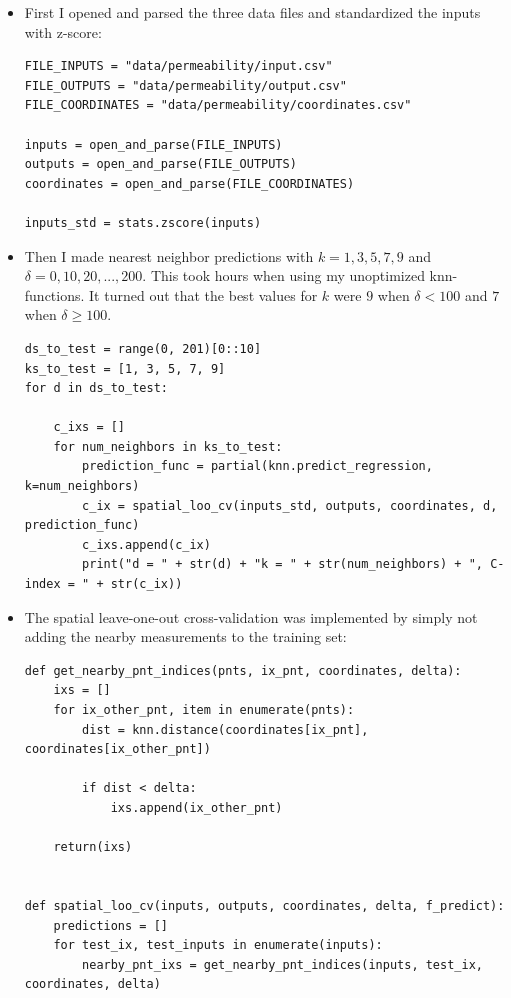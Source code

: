 \documentclass[a4paper]{article}
\begin{document}
\begin{itemize}
\item First I opened and parsed the three data files and standardized the inputs with z-score:


\selectfont
\footnotesize
\begin{lstlisting}
FILE_INPUTS = "data/permeability/input.csv"
FILE_OUTPUTS = "data/permeability/output.csv"
FILE_COORDINATES = "data/permeability/coordinates.csv"

inputs = open_and_parse(FILE_INPUTS)
outputs = open_and_parse(FILE_OUTPUTS)
coordinates = open_and_parse(FILE_COORDINATES)

inputs_std = stats.zscore(inputs)
\end{lstlisting}
\normalsize
\fontfamily{\sfdefault}\selectfont

\item Then I made nearest neighbor predictions with $k = 1,3,5,7,9$ and $\delta = 0, 10, 20, ...,200$. This took hours when using my unoptimized knn-functions. It turned out that the best values for $k$ were $9$ when $\delta < 100$ and $7$ when $\delta \geq 100$.
\selectfont
\footnotesize
\begin{lstlisting}
ds_to_test = range(0, 201)[0::10]
ks_to_test = [1, 3, 5, 7, 9]
for d in ds_to_test:
    
    c_ixs = []
    for num_neighbors in ks_to_test:    
        prediction_func = partial(knn.predict_regression, k=num_neighbors)
        c_ix = spatial_loo_cv(inputs_std, outputs, coordinates, d, prediction_func)
        c_ixs.append(c_ix)
        print("d = " + str(d) + "k = " + str(num_neighbors) + ", C-index = " + str(c_ix))
\end{lstlisting}
\normalsize
\fontfamily{\sfdefault}\selectfont

\item The spatial leave-one-out cross-validation was implemented by simply not adding the nearby measurements to the training set: 
\selectfont
\footnotesize
\begin{lstlisting}
def get_nearby_pnt_indices(pnts, ix_pnt, coordinates, delta):
    ixs = []
    for ix_other_pnt, item in enumerate(pnts):
        dist = knn.distance(coordinates[ix_pnt], coordinates[ix_other_pnt])

        if dist < delta:
            ixs.append(ix_other_pnt)

    return(ixs)


def spatial_loo_cv(inputs, outputs, coordinates, delta, f_predict):
    predictions = []
    for test_ix, test_inputs in enumerate(inputs):
        nearby_pnt_ixs = get_nearby_pnt_indices(inputs, test_ix, coordinates, delta)


\end{lstlisting}
\end{itemize}
\end{document}

